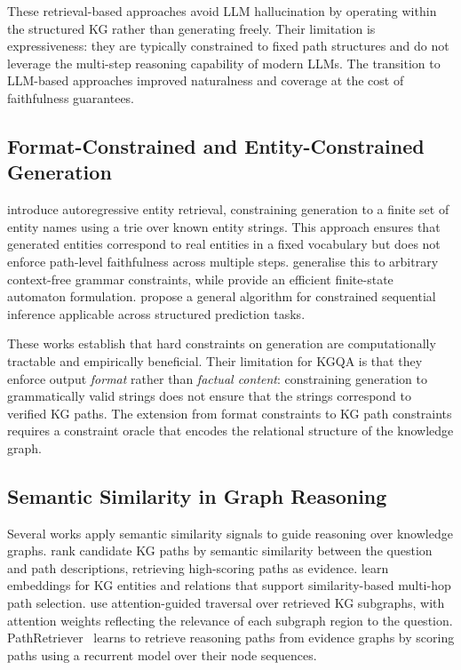 These retrieval-based approaches avoid LLM hallucination by operating within the structured KG rather than generating freely. Their limitation is expressiveness: they are typically constrained to fixed path structures and do not leverage the multi-step reasoning capability of modern LLMs. The transition to LLM-based approaches improved naturalness and coverage at the cost of faithfulness guarantees.

\subsection{Format-Constrained and Entity-Constrained Generation}

\citet{decao2021autoregressive} introduce autoregressive entity retrieval, constraining generation to a finite set of entity names using a trie over known entity strings. This approach ensures that generated entities correspond to real entities in a fixed vocabulary but does not enforce path-level faithfulness across multiple steps. \citet{geng2023gcd} generalise this to arbitrary context-free grammar constraints, while \citet{willard2023outlines} provide an efficient finite-state automaton formulation. \citet{deutsch2019constrained} propose a general algorithm for constrained sequential inference applicable across structured prediction tasks.

These works establish that hard constraints on generation are computationally tractable and empirically beneficial. Their limitation for KGQA is that they enforce output \textit{format} rather than \textit{factual content}: constraining generation to grammatically valid strings does not ensure that the strings correspond to verified KG paths. The extension from format constraints to KG path constraints requires a constraint oracle that encodes the relational structure of the knowledge graph.

\subsection{Semantic Similarity in Graph Reasoning}

Several works apply semantic similarity signals to guide reasoning over knowledge graphs. \citet{shi2021kgpath} rank candidate KG paths by semantic similarity between the question and path descriptions, retrieving high-scoring paths as evidence. \citet{saxena2022kgqa} learn embeddings for KG entities and relations that support similarity-based multi-hop path selection. \citet{he2021multihop} use attention-guided traversal over retrieved KG subgraphs, with attention weights reflecting the relevance of each subgraph region to the question. PathRetriever~\citep{asai2019learning} learns to retrieve reasoning paths from evidence graphs by scoring paths using a recurrent model over their node sequences.

